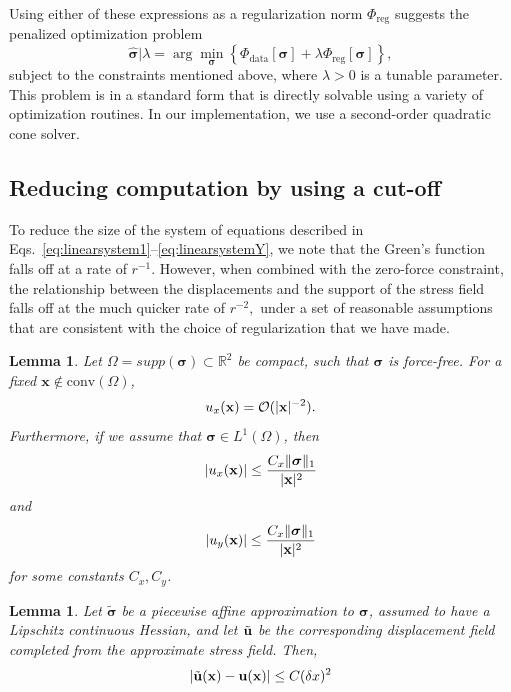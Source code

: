 \documentclass[aps,prl,reprint,twocolumn,groupedaddress,showpacs]{revtex4-1}
\newtheorem{lem}[thm]{Lemma}%
\DeclarePairedDelimiter{\norm}{\lVert}{\rVert}
\newcommand{\bsigma}{{\boldsymbol\sigma}}
\def\u{{\bf u}}
\def\x{{\bf x}}
\begin{document}
Using either of these expressions as a regularization norm $\Phi_{\textrm{reg}}$ suggests the penalized optimization problem
\begin{equation}
\hat{\bsigma} \big\vert \lambda = \arg\min_{\bsigma} \left\{ \Phi_{\textrm{data}}[\bsigma] + \lambda\Phi_{\textrm{reg}}[\bsigma] \right\},\label{eq:objective}
\end{equation}
subject to the constraints mentioned above,
where $\lambda>0$ is a tunable parameter. This problem
 is in a standard form that is directly solvable using a variety of optimization routines.
  In our implementation, we use a second-order  quadratic cone solver. 
\subsection{Reducing computation by using a cut-off}
To reduce the size of the system of equations described in Eqs.~\ref{eq:linearsystem1}--\ref{eq:linearsystemY}, we note that the Green's function falls off at a rate of $r^{-1}$. However,
when combined with the zero-force constraint, the relationship between the displacements
and the support of the stress field falls off at the much quicker rate of $r^{-2},$ under a
set of reasonable assumptions that are consistent with the choice of regularization that we have
made.

\begin{lem} 
      \label{lem:multipole}
Let $\Omega = supp(\bsigma)\subset \mathbb{R}^2$ be compact, such that $\bsigma$ is force-free.  For a fixed $\mathbf{x}\not\in\textrm{conv}(\Omega)$,
\begin{equation}
u_x(\x) = \mathcal{O}(|\x|^{-2}).
\end{equation}
Furthermore, if we assume that $\bsigma\in L^1(\Omega)$, then
\begin{equation}
\vert u_x(\mathbf{x}) \vert \leq \frac{C_x\norm{\bsigma}_1}{|\x|^2}
\end{equation}      
and
\begin{equation}
\vert u_y(\mathbf{x}) \vert \leq \frac{C_x\norm{\bsigma}_1}{|\x|^2}
\end{equation}      
for some constants $C_x,C_y$.

\end{lem}

\begin{lem}
\label{lem:affine_error}
Let $\tilde{\bsigma}$ be a piecewise affine approximation to $\bsigma$,   assumed to have a Lipschitz continuous Hessian, and let $\tilde{\u}$ be the corresponding displacement field completed from the approximate stress field. Then, 
\begin{equation}
\vert \tilde{\u}(\x)  - \u(\x) \vert \leq C (\delta x)^2
\end{equation}
\end{lem}
\end{document}
